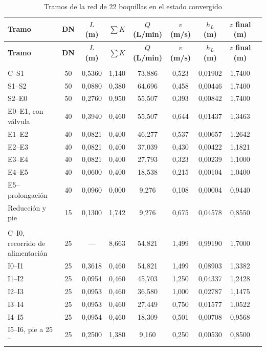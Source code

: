 \begingroup
\small\singlespacing
\setlength{\tabcolsep}{3.5pt}
\begin{longtable}{@{}>{\raggedright\arraybackslash}p{3.6cm}cccccccc@{}}
\caption{Tramos de la red de 22 boquillas en el estado convergido}\label{tab:red22-tramos}\\
\toprule
\textbf{Tramo} & \textbf{DN} & \textbf{$L$ (m)} & \textbf{$\sum K$} & \textbf{$Q$ (L/min)} & \textbf{$v$ (m/s)} & \textbf{$h_L$ (m)} & \textbf{$z$ final (m)}\\
\midrule\endfirsthead
\toprule
\textbf{Tramo} & \textbf{DN} & \textbf{$L$ (m)} & \textbf{$\sum K$} & \textbf{$Q$ (L/min)} & \textbf{$v$ (m/s)} & \textbf{$h_L$ (m)} & \textbf{$z$ final (m)}\\
\midrule\endhead
\bottomrule\endlastfoot
\multicolumn{8}{@{}l}{\textit{Lado exterior (uno de dos)}}\\
C--S1 & 50 & 0,5360 & 1,140 & 73,886 & 0,523 & 0,01902 & 1,7400\\
S1--S2 & 50 & 0,0880 & 0,380 & 64,696 & 0,458 & 0,00446 & 1,7400\\
S2--E0 & 50 & 0,2760 & 0,950 & 55,507 & 0,393 & 0,00842 & 1,7400\\
E0--E1, con válvula & 40 & 0,3940 & 0,460 & 55,507 & 0,644 & 0,01437 & 1,3463\\
E1--E2 & 40 & 0,0821 & 0,400 & 46,277 & 0,537 & 0,00657 & 1,2642\\
E2--E3 & 40 & 0,0821 & 0,400 & 37,039 & 0,430 & 0,00422 & 1,1821\\
E3--E4 & 40 & 0,0821 & 0,400 & 27,793 & 0,323 & 0,00239 & 1,1000\\
E4--E5 & 40 & 0,0600 & 0,400 & 18,538 & 0,215 & 0,00104 & 1,0400\\
E5--prolongación & 40 & 0,0960 & 0,000 & 9,276 & 0,108 & 0,00004 & 0,9440\\
Reducción y pie & 15 & 0,1300 & 1,742 & 9,276 & 0,675 & 0,04578 & 0,8550\\
\multicolumn{8}{@{}l}{\textit{Lanza}}\\
C--I0, recorrido de alimentación & 25 & --- & 8,663 & 54,821 & 1,499 & 0,99190 & 1,7000\\
I0--I1 & 25 & 0,3618 & 0,460 & 54,821 & 1,499 & 0,08903 & 1,3382\\
I1--I2 & 25 & 0,0954 & 0,460 & 45,703 & 1,250 & 0,04337 & 1,2428\\
I2--I3 & 25 & 0,0953 & 0,460 & 36,580 & 1,000 & 0,02787 & 1,1475\\
I3--I4 & 25 & 0,0953 & 0,460 & 27,449 & 0,750 & 0,01577 & 1,0522\\
I4--I5 & 25 & 0,0954 & 0,460 & 18,309 & 0,501 & 0,00708 & 0,9568\\
I5--I6, pie a 25$^\circ$ & 25 & 0,2500 & 1,380 & 9,160 & 0,250 & 0,00530 & 0,8500\\
\end{longtable}
\endgroup

